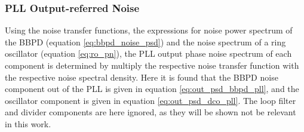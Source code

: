 	\subsubsection{PLL Output-referred Noise}\label{sec:pll_output_noise}
		Using the noise transfer functions, the expressions for noise power spectrum of the BBPD (equation \ref{eq:bbpd_noise_psd}) and the noise spectrum of a ring oscillator (equation \ref{eq:ro_pn}), the PLL output phase noise spectrum of each component is determined by multiply the respective noise transfer function with the respective noise spectral density. Here it is found that the BBPD noise component out of the PLL is given in equation \ref{eq:out_psd_bbpd_pll}, and the oscillator component is given in equation \ref{eq:out_psd_dco_pll}. The loop filter and divider components are here ignored, as they will be shown not be relevant in this work. 

